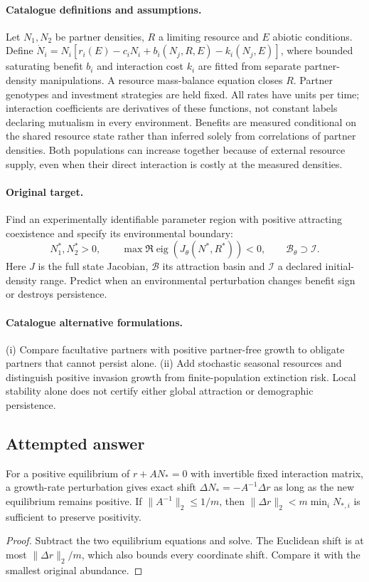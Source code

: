 \documentclass[11pt]{article}
\begin{document}
\paragraph{Catalogue definitions and assumptions.}
Let $N_1,N_2$ be partner densities, $R$ a limiting resource and $E$ abiotic conditions. Define $\dot N_i=N_i[r_i(E)-c_iN_i+b_i(N_j,R,E)-k_i(N_j,E)]$, where bounded saturating benefit $b_i$ and interaction cost $k_i$ are fitted from separate partner-density manipulations. A resource mass-balance equation closes $R$. Partner genotypes and investment strategies are held fixed. All rates have units per time; interaction coefficients are derivatives of these functions, not constant labels declaring mutualism in every environment. Benefits are measured conditional on the shared resource state rather than inferred solely from correlations of partner densities. Both populations can increase together because of external resource supply, even when their direct interaction is costly at the measured densities.
\paragraph{Original target.}
Find an experimentally identifiable parameter region with positive attracting coexistence and specify its environmental boundary:
\[
 N_1^*,N_2^*>0,\qquad
 \max\Re\operatorname{eig}(J_\theta(N^*,R^*))<0,
 \qquad \mathcal B_\theta\supset\mathcal I.
\]
Here $J$ is the full state Jacobian, $\mathcal B$ its attraction basin and $\mathcal I$ a declared initial-density range. Predict when an environmental perturbation changes benefit sign or destroys persistence.
\paragraph{Catalogue alternative formulations.}
(i) Compare facultative partners with positive partner-free growth to obligate partners that cannot persist alone. (ii) Add stochastic seasonal resources and distinguish positive invasion growth from finite-population extinction risk. Local stability alone does not certify either global attraction or demographic persistence.
\subsection{Attempted answer}
\begin{proposition}
For a positive equilibrium of $r+AN_*=0$ with invertible fixed interaction matrix, a growth-rate perturbation gives exact shift $\Delta N_*=-A^{-1}\Delta r$ as long as the new equilibrium remains positive. If $\|A^{-1}\|_2\leq1/m$, then $\|\Delta r\|_2<m\min_iN_{*,i}$ is sufficient to preserve positivity.
\end{proposition}
\begin{proof}
Subtract the two equilibrium equations and solve. The Euclidean shift is at most $\|\Delta r\|_2/m$, which also bounds every coordinate shift. Compare it with the smallest original abundance.
\end{proof}
\end{document}
